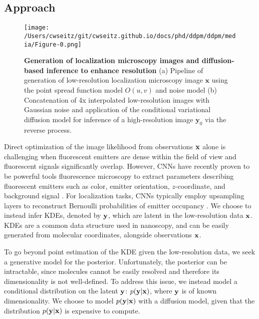 \subsection{Approach}

\begin{figure}[t]
\centering
\texttt{[image: /Users/cwseitz/git/cwseitz.github.io/docs/phd/ddpm/ddpm/media/Figure-0.png]}
\caption{\textbf{Generation of localization microscopy images and diffusion-based inference to enhance resolution} (a) Pipeline of generation of low-resolution localization microscopy image $\mathbf{x}$ using the point spread function model $O\left(u,v\right)$ and noise model (b) Concatenation of 4x interpolated low-resolution images with Gaussian noise and application of the conditional variational diffusion model for inference of a high-resolution image $\mathbf{y}_0$ via the reverse process.}
\label{fig:fig60}
\end{figure}


Direct optimization of the image likelihood from observations $\bold{x}$ alone is challenging when fluorescent emitters are dense within the field of view and fluorescent signals significantly overlap. However, CNNs have recently proven to be powerful tools fluorescence microscopy to extract parameters describing fluorescent emitters such as color, emitter orientation, $z$-coordinate, and background signal \cite{Zhang2018,Kim2019,Zelger2018}. For localization tasks, CNNs typically employ upsampling layers to reconstruct Bernoulli probabilities of emitter occupancy \parencite{Speiser2021,Nehme2020}. We choose to instead infer KDEs, denoted by $\bold{y}$, which are latent in the low-resolution data $\bold{x}$. KDEs are a common data structure used in nanoscopy, and can be easily generated from molecular coordinates, alongside observations $\bold{x}$.

To go beyond point estimation of the KDE given the low-resolution data, we seek a generative model for the posterior. Unfortunately, the posterior can be intractable, since molecules cannot be easily resolved and therefore its dimensionality is not well-defined. To address this issue, we instead model a conditional distribution on the latent $\bold{y}$: $p(\bold{y}\lvert\bold{x})$, where $\bold{y}$ is of known dimensionality. We choose to model $p(\bold{y}\lvert\bold{x})$ with a diffusion model, given that the distribution $p(\bold{y}\lvert\bold{x})$ is expensive to compute.


